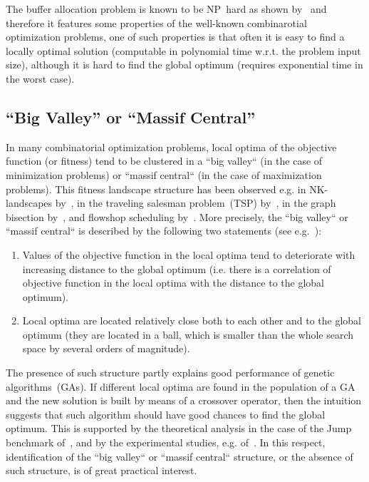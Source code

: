 \documentclass{ifacconf}
\begin{document}
The buffer allocation problem is known to be NP~hard as shown by~\cite{DEKS2013,DEKS2018}  and therefore it features some properties of the
well-known combinarotial optimization problems, one of such properties is that often it is easy to find a locally optimal solution (computable in polynomial time 
w.r.t. the problem input size), although it is hard to find the global optimum (requires exponential time in the worst case).  

\subsection{``Big Valley'' or ``Massif Central''}\label{subsec:landscapes}

In many combinatorial optimization problems, local optima of the objective function (or fitness)  tend to be clustered in a ``big valley`` (in  the case of minimization problems) or
``massif central`` (in  the case of maximization problems). This fitness landscape structure has been observed  e.g. in 
NK-landscapes by~\cite{KL87}, in the traveling salesman problem~(TSP) by~\cite{Boese,Hains}, in the graph bisection by~\cite{Boese}, and 
flowshop scheduling by~\cite{Reeves99}. More precisely, the ``big valley`` or
``massif central`` is described by the following two statements (see e.g.~\cite{Boese}):
\begin{enumerate}
\item Values of the objective function in the local optima tend to deteriorate with increasing distance to the global optimum (i.e. there is a correlation 
of objective function in the local optima with the distance to the global optimum).
\item Local optima are located relatively close both to each other and to the global optimum (they are located in a ball, which is smaller than 
the whole search space by several orders of magnitude).
\end{enumerate}
The presence of such structure partly explains good performance of genetic
algorithms~(GAs). If different local optima are found in the population of a GA and
the new solution is built by means of a crossover operator, 
then the intuition suggests that such algorithm should have good chances to find the
global optimum. This is supported by the theoretical analysis in the case of the Jump benchmark of~\cite{bib:Dang2016a}, and
by the experimental studies, e.g. of~\cite{Hains}.
In this respect, identification of the ``big valley`` or
``massif central`` structure, or the absence of such structure, is of great practical interest.
\end{document}
